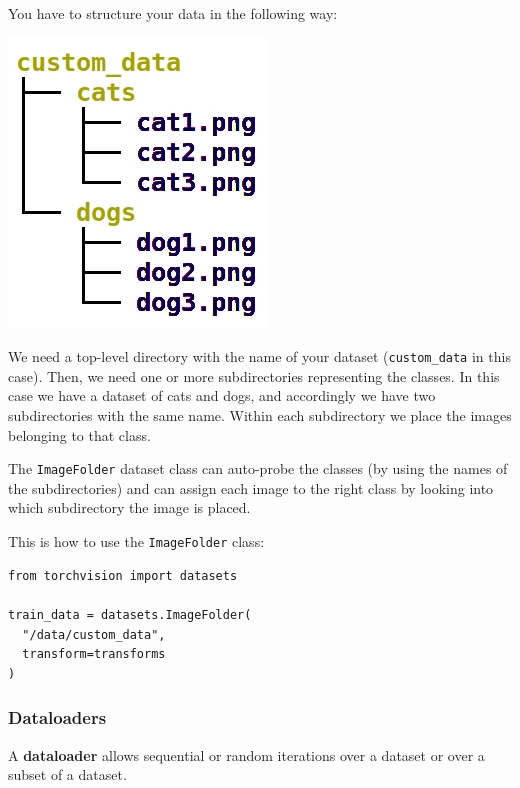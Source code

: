 You have to structure your data in the following way:

\includegraphics[width=0.5\linewidth]{img//cnn/imagefolder.jpeg}

We need a top-level directory with the name of your dataset (\verb|custom_data| in this case). Then, we need one or more subdirectories representing the classes. In this case we have a dataset of cats and dogs, and accordingly we have two subdirectories with the same name. Within each subdirectory we place the images belonging to that class. \newline

The \verb|ImageFolder| dataset class can auto-probe the classes (by using the names of the subdirectories) and can assign each image to the right class by looking into which subdirectory the image is placed. \newline

This is how to use the \verb|ImageFolder| class:
\begin{lstlisting}
from torchvision import datasets

train_data = datasets.ImageFolder(
  "/data/custom_data",
  transform=transforms
)
\end{lstlisting}
\subsubsection{Dataloaders}

A \textbf{dataloader} allows sequential or random iterations over a dataset or over a subset of a dataset.\newline

